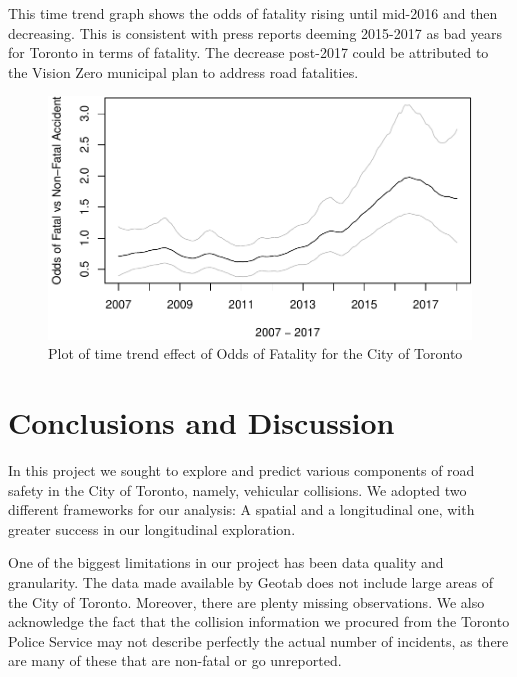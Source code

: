 \documentclass[]{article}
\begin{document}
This time trend graph shows the odds of fatality rising until mid-2016
and then decreasing. This is consistent with press reports deeming
2015-2017 as bad years for Toronto in terms of fatality. The decrease
post-2017 could be attributed to the Vision Zero municipal plan to
address road fatalities.

\begin{figure}[H]

{\centering \includegraphics{Project_II-Final-20190404_files/figure-latex/unnamed-chunk-22-1} 

}

\caption{\label{fig:figs}Plot of time trend effect of Odds of Fatality for the City of Toronto}\label{fig:unnamed-chunk-22}
\end{figure}

\section{Conclusions and Discussion}\label{conclusions-and-discussion}

In this project we sought to explore and predict various components of
road safety in the City of Toronto, namely, vehicular collisions. We
adopted two different frameworks for our analysis: A spatial and a
longitudinal one, with greater success in our longitudinal exploration.

One of the biggest limitations in our project has been data quality and
granularity. The data made available by Geotab does not include large
areas of the City of Toronto. Moreover, there are plenty missing
observations. We also acknowledge the fact that the collision
information we procured from the Toronto Police Service may not describe
perfectly the actual number of incidents, as there are many of these
that are non-fatal or go unreported.
\end{document}
